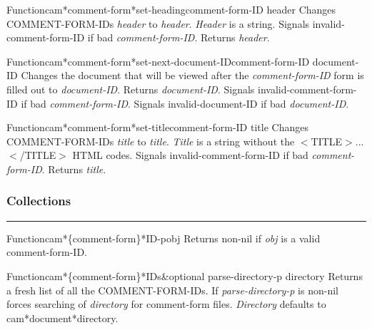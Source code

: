 \begin{functiondoc}{Function}{cam*comment-form*set-heading}{comment-form-ID header}
Changes COMMENT-FORM-IDs {\em header} to {\em header}.
{\em Header} is a string.
Signals invalid-comment-form-ID if bad {\em comment-form-ID}.
Returns {\em header}.
\end{functiondoc}

\begin{functiondoc}{Function}{cam*comment-form*set-next-document-ID}{comment-form-ID document-ID}
Changes the document that will be viewed after the {\em comment-form-ID} form is 
filled out to {\em document-ID}.
Returns {\em document-ID}.
Signals invalid-comment-form-ID if bad {\em comment-form-ID}.
Signals invalid-document-ID if bad {\em document-ID}.
\end{functiondoc}

\begin{functiondoc}{Function}{cam*comment-form*set-title}{comment-form-ID title}
Changes COMMENT-FORM-IDs {\em title} to {\em title}.
{\em Title} is a string without the $<$TITLE$>$...$<$/TITLE$>$ HTML codes.
Signals invalid-comment-form-ID if bad {\em comment-form-ID}.
Returns {\em title}.
\end{functiondoc}


\subsubsection*{Collections}
\par\vspace*{0.00in}\par\hrule\par\medskip\par


\begin{functiondoc}{Function}{cam*\{comment-form\}*ID-p}{obj}
Returns non-nil if {\em obj} is a valid comment-form-ID.
\end{functiondoc}

\begin{functiondoc}{Function}{cam*\{comment-form\}*IDs}{\&optional parse-directory-p directory}
Returns a fresh list of all the COMMENT-FORM-IDs.
If {\em parse-directory-p} is non-nil forces searching of {\em directory} for comment-form files.
{\em Directory} defaults to cam*document*directory.
\end{functiondoc}


